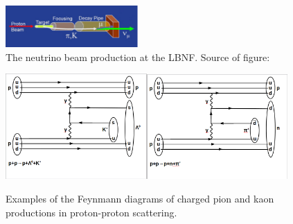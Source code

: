 \begin{figure}
\caption{The neutrino beam production at the LBNF. Source of figure: \cite{ref_LBNFweb}}
\label{fig:LBNF_nuBeam}
\centering
\includegraphics[width=0.45\textwidth, keepaspectratio=true]{figs/LBNF_nuBeam.png}  
\end{figure}


\begin{figure}
\caption{Examples of the Feynmann diagrams of charged pion and kaon productions in proton-proton scattering.}
\label{fig:pionAndKaonProductions}
\centering
\includegraphics[width=0.48\textwidth, keepaspectratio=true]{figs/ppKaonProduction.png}\includegraphics[width=0.48\textwidth, keepaspectratio=true]{figs/ppPionProduction.png}  
\end{figure}


